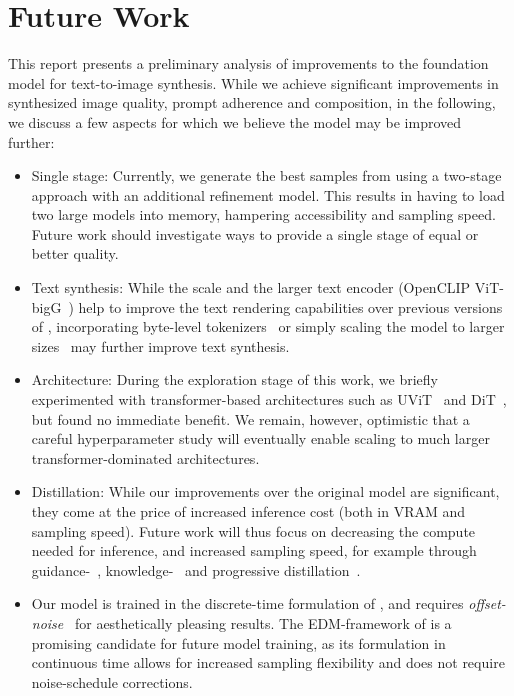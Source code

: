\documentclass{article}
\begin{document}
%
%


%
%
%
%
%
%


%


\section{Future Work}
\enlargethispage{2\baselineskip}
%
This report presents a preliminary analysis of improvements to the foundation model \sd for text-to-image synthesis. While we achieve significant improvements in synthesized image quality, prompt adherence and composition, in the following, we discuss a few aspects for which we believe the model may be improved further: 

\begin{itemize}
\item Single stage: Currently, we generate the best samples from \modelname using a two-stage approach with an additional refinement model. This results in having to load two large models into memory, hampering accessibility and sampling speed. Future work should investigate ways to provide a single stage of equal or better quality.

\item Text synthesis: While the scale and the larger text encoder (OpenCLIP ViT-bigG~\cite{ilharco_gabriel_2021_5143773}) help to improve the text rendering capabilities over previous versions of \sd, incorporating byte-level tokenizers~\cite{xue2022byt5,liu2023characteraware} or simply scaling the model to larger sizes~\cite{yu2022scaling,saharia2022photorealistic} may further improve text synthesis.

\item Architecture: During the exploration stage of this work, we briefly experimented with transformer-based architectures such as UViT~\cite{hoogeboom2023simple} and DiT~\cite{peebles2022scalable}, but found no immediate benefit. We remain, however, optimistic that a careful hyperparameter study will eventually enable scaling to much larger transformer-dominated architectures.

%

\item Distillation: While our improvements over the original \sd model are significant, they come at the price of increased inference cost (both in VRAM and sampling speed). Future work will thus focus on decreasing the compute needed for inference, and increased sampling speed, for example through guidance-~\cite{meng2023distillation}, knowledge-~\cite{dockhorn2023distilling,kim2023architectural,li2023snapfusion} and progressive distillation~\cite{salimans2022progressive,berthelot2023tract,meng2023distillation}.

\item Our model is trained in the discrete-time formulation of \cite{ho2020denoising}, and requires \emph{offset-noise}~\cite{guttenberg2023diffusion, lin2023common} for aesthetically pleasing results. The EDM-framework of \citet{karras2022elucidating} is a promising candidate for future model training, as its formulation in continuous time allows for increased sampling flexibility and does not require noise-schedule corrections.
\end{itemize}
\end{document}
